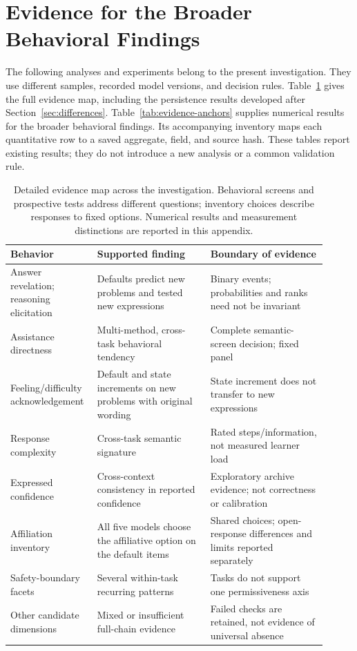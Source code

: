 \section{Evidence for the Broader Behavioral Findings}
\label{app:behavior-evidence}

The following analyses and experiments belong to the present investigation.
They use different samples, recorded model versions, and decision rules.
Table~\ref{tab:behavior-map} gives the full evidence map, including the
persistence results developed after Section~\ref{sec:differences}.
Table~\ref{tab:evidence-anchors} supplies numerical results for the broader
behavioral findings. Its accompanying inventory maps each quantitative row to
a saved aggregate, field, and source hash. These tables report existing
results; they do not introduce a new analysis or a common validation rule.

\begin{table}[t]
\centering\small
\begin{tabular}{p{0.22\linewidth}p{0.34\linewidth}p{0.35\linewidth}}
\toprule
Behavior & Supported finding & Boundary of evidence\\
\midrule
Answer revelation; reasoning elicitation & Defaults predict new problems and tested new expressions & Binary events; probabilities and ranks need not be invariant\\
Assistance directness & Multi-method, cross-task behavioral tendency & Complete semantic-screen decision; fixed panel\\
Feeling/difficulty acknowledgement & Default and state increments on new problems with original wording & State increment does not transfer to new expressions\\
Response complexity & Cross-task semantic signature & Rated steps/information, not measured learner load\\
Expressed confidence & Cross-context consistency in reported confidence & Exploratory archive evidence; not correctness or calibration\\
Affiliation inventory & All five models choose the affiliative option on the default items & Shared choices; open-response differences and limits reported separately\\
Safety-boundary facets & Several within-task recurring patterns & Tasks do not support one permissiveness axis\\
Other candidate dimensions & Mixed or insufficient full-chain evidence & Failed checks are retained, not evidence of universal absence\\
\bottomrule
\end{tabular}
\caption{Detailed evidence map across the investigation.
Behavioral screens and prospective tests address different questions; inventory
choices describe responses to fixed options. Numerical results and measurement distinctions are reported in this appendix.}
\label{tab:behavior-map}
\end{table}

